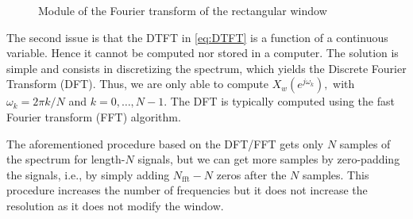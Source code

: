 \begin{figure}
	\begin{center}
	\end{center}
	\caption{Module of the Fourier transform of the rectangular window}
	\label{fig:FT_rectangularwindow}
\end{figure}

The second issue is that the DTFT in \eqref{eq:DTFT} is a function of a continuous variable. Hence it cannot be computed nor stored in a computer. The solution is simple and consists in discretizing the spectrum, which yields the Discrete Fourier Transform (DFT). Thus, we are only able to compute $X_w(e^{j \omega_k}),$ with $\omega_k = 2 \pi k/N$ and $k = 0, \ldots, N-1$. The DFT is typically computed using the fast Fourier transform (FFT) algorithm. 

The aforementioned procedure based on the DFT/FFT gets only $N$ samples of the spectrum for length-$N$ signals, but we can get more samples by zero-padding the signals, i.e., by simply adding $N_\text{fft} - N$ zeros after the $N$ samples. This procedure increases the number of frequencies but it does not increase the resolution as it does not modify the window.
	
